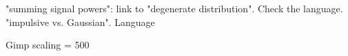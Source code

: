 "summing signal powers": link to "degenerate distribution". Check the language.
"impulsive vs. Gaussian". Language

Gimp scaling = 500 
